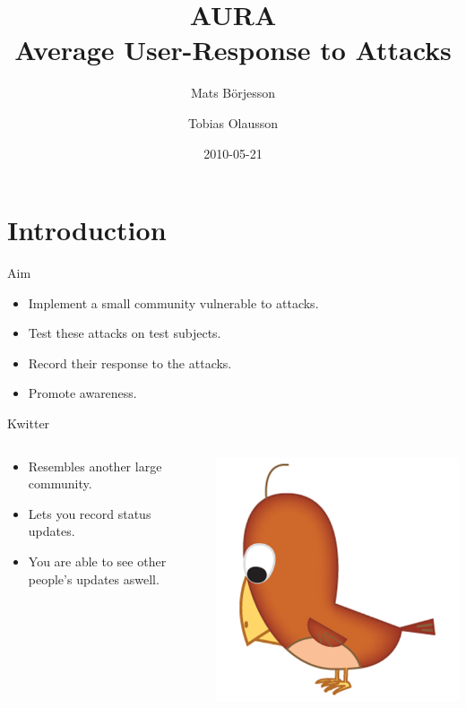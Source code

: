 \documentclass{beamer}
\title{AURA \\ Average User-Response to Attacks}
\author{Mats Börjesson \and Tobias Olausson}
\date{2010-05-21}
\begin{document}
\section{Introduction}

\frame{\titlepage}
\begin{frame}{Aim}
    \begin{itemize}
        \item Implement a small community vulnerable to attacks.
        \item Test these attacks on test subjects.
        \item Record their response to the attacks.
        \item Promote awareness.
    \end{itemize}
\end{frame}

\begin{frame}{Kwitter}
    \begin{columns}[c]
    \begin{column}{.5\textwidth}
        \begin{itemize}
            \item Resembles another large community.
            \item Lets you record status updates.
            \item You are able to see other people's updates aswell.
        \end{itemize}
    \end{column}
    \begin{column}{.5\textwidth}
        \includegraphics[width=.6\textwidth]{bird.jpg}
    \end{column}
    \end{columns}
\end{frame}
\end{document}
